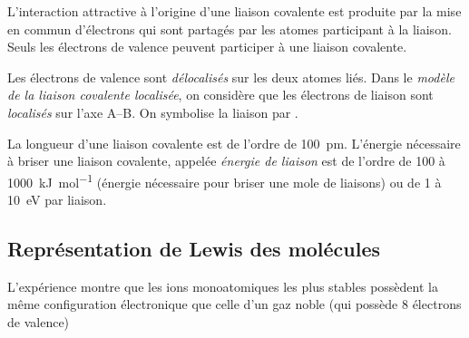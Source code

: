 \documentclass{cours}
\begin{document}
L'interaction attractive à l'origine d'une liaison covalente est produite par la mise en commun d'électrons qui sont partagés par les atomes participant à la liaison. Seuls les électrons de valence peuvent participer à une liaison covalente.
\begin{center}
\end{center}


Les électrons de valence sont \emph{délocalisés} sur les deux atomes liés. Dans le \emph{modèle de la liaison covalente localisée}, on considère que les électrons de liaison sont \emph{localisés} sur l'axe A--B. On symbolise la liaison par .

La longueur d'une liaison covalente est de l'ordre de \SI{100}{pm}. L'énergie nécessaire à briser une liaison covalente, appelée \emph{énergie de liaison} est de l'ordre de 100 à \SI{1000}{kJ\per\mol} (énergie nécessaire pour briser une mole de liaisons) ou de 1 à \SI{10}{eV} par liaison.


\subsection{Représentation de Lewis des molécules}%
\label{sub:representation_de_lewis_des_molecules}

L'expérience montre que les ions monoatomiques les plus stables possèdent la même configuration électronique que celle d'un gaz noble (qui possède 8 électrons de valence)
\end{document}

